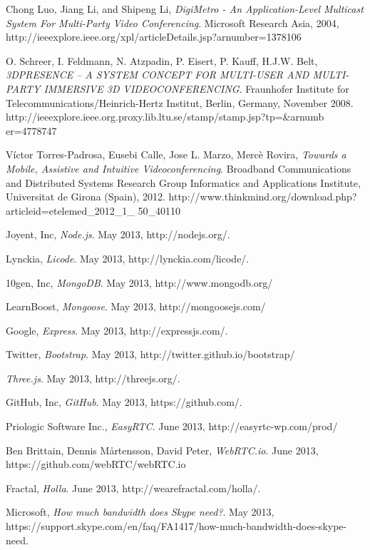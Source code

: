\documentclass[12pt, titlepage]{article}
\begin{document}
\begin{thebibliography}{9}
Chong Luo, Jiang Li, and Shipeng Li,
\emph{DigiMetro - An Application-Level Multicast System For Multi-Party Video Conferencing}.
Microsoft Research Asia,
2004,
http://ieeexplore.ieee.org/xpl/articleDetails.jsp?arnumber=1378106

O. Schreer, I. Feldmann, N. Atzpadin, P. Eisert, P. Kauff, H.J.W. Belt, 
\emph{3DPRESENCE – A SYSTEM CONCEPT FOR MULTI-USER AND MULTI-PARTY IMMERSIVE 3D VIDEOCONFERENCING}.
Fraunhofer Institute for Telecommunications/Heinrich-Hertz Institut, Berlin, Germany, November 2008.
http://ieeexplore.ieee.org.proxy.lib.ltu.se/stamp/stamp.jsp?tp=\&arnumb er=4778747

Víctor Torres-Padrosa, Eusebi Calle, Jose L. Marzo, Mercè Rovira,
\emph{Towards a Mobile, Assistive and Intuitive Videoconferencing}.
Broadband Communications and Distributed Systems Research Group Informatics and Applications Institute, Universitat de Girona (Spain), 2012.
http://www.thinkmind.org/download.php?articleid=etelemed\_2012\_1\_ 50\_40110

  Joyent, Inc,
  \emph{Node.js}.
  May 2013,
  http://nodejs.org/.
  
  Lynckia,
  \emph{Licode}.
  May 2013,
  http://lynckia.com/licode/.
  
  10gen, Inc,
  \emph{MongoDB}.
  May 2013,
  http://www.mongodb.org/
  
  LearnBoost,
  \emph{Mongoose}.
  May 2013,
  http://mongoosejs.com/
  
  Google,
  \emph{Express}.
  May 2013,
  http://expressjs.com/.
  
  Twitter,
  \emph{Bootstrap}.
  May 2013,
  http://twitter.github.io/bootstrap/
  
  \emph{Three.js}.
  May 2013,
  http://threejs.org/.
  
  GitHub, Inc,
  \emph{GitHub}.
  May 2013,
  https://github.com/.
  
  Priologic Software Inc.,
  \emph{EasyRTC}.
  June 2013,
  http://easyrtc-wp.com/prod/

  Ben Brittain, Dennis Mårtensson, David Peter,
  \emph{WebRTC.io}.
  June 2013,
  https://github.com/webRTC/webRTC.io
  
  Fractal,
  \emph{Holla}.
  June 2013,
   http://wearefractal.com/holla/. 

Microsoft,
\emph{ How much bandwidth does Skype need?}.
May 2013,
https://support.skype.com/en/faq/FA1417/how-much-bandwidth-does-skype-need.

\end{thebibliography}
\end{document}
